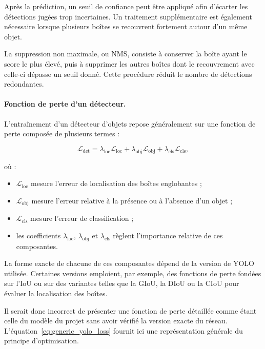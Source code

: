 \documentclass[11pt,a4paper]{report}
\begin{document}
Après la prédiction, un seuil de confiance peut être appliqué afin d'écarter les
détections jugées trop incertaines. Un traitement supplémentaire est également
nécessaire lorsque plusieurs boîtes se recouvrent fortement autour d'un même
objet.

La suppression non maximale, ou NMS, consiste à conserver la boîte ayant le
score le plus élevé, puis à supprimer les autres boîtes dont le recouvrement
avec celle-ci dépasse un seuil donné. Cette procédure réduit le nombre de
détections redondantes.

\paragraph{Fonction de perte d'un détecteur.}

L'entraînement d'un détecteur d'objets repose généralement sur une fonction de
perte composée de plusieurs termes :

\begin{equation}
    \mathcal{L}_{\mathrm{det}}
    =
    \lambda_{\mathrm{loc}}
    \mathcal{L}_{\mathrm{loc}}
    +
    \lambda_{\mathrm{obj}}
    \mathcal{L}_{\mathrm{obj}}
    +
    \lambda_{\mathrm{cls}}
    \mathcal{L}_{\mathrm{cls}},
    \label{eq:generic_yolo_loss}
\end{equation}

où :

\begin{itemize}
    \item $\mathcal{L}_{\mathrm{loc}}$ mesure l'erreur de localisation des
    boîtes englobantes ;
    \item $\mathcal{L}_{\mathrm{obj}}$ mesure l'erreur relative à la présence
    ou à l'absence d'un objet ;
    \item $\mathcal{L}_{\mathrm{cls}}$ mesure l'erreur de classification ;
    \item les coefficients $\lambda_{\mathrm{loc}}$,
    $\lambda_{\mathrm{obj}}$ et $\lambda_{\mathrm{cls}}$ règlent
    l'importance relative de ces composantes.
\end{itemize}

La forme exacte de chacune de ces composantes dépend de la version de YOLO
utilisée. Certaines versions emploient, par exemple, des fonctions de perte
fondées sur l'IoU ou sur des variantes telles que la GIoU, la DIoU ou la CIoU
pour évaluer la localisation des boîtes.

Il serait donc incorrect de présenter une fonction de perte détaillée comme
étant celle du modèle du projet sans avoir vérifié la version exacte du réseau.
L'équation~\eqref{eq:generic_yolo_loss} fournit ici une représentation générale
du principe d'optimisation.
\end{document}
